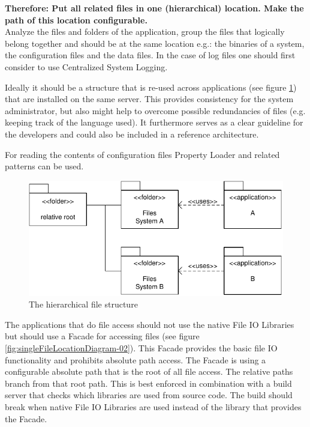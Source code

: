 \begin{center}
   
\end{center}

\textbf{Therefore: Put all related files in one (hierarchical) location. Make the path of this location configurable.}\\

Analyze the files and folders of the application, group the files that logically belong together and should be at the same location e.g.: the binaries of a system, the configuration files and the data files. In the case of log files one should first consider to use {\sc Centralized System Logging}.

Ideally it should be a structure that is re-used across applications (see figure \ref{fig:singleFileLocationDiagram-01}) that are installed on the same server. This provides consistency for the system administrator, but also might help to overcome possible redundancies of files (e.g. keeping track of the language used). It furthermore serves as a clear guideline for the developers and could also be included in a reference architecture.

For reading the contents of configuration files {\sc Property Loader} and related patterns \cite{Wellhausen2010} can be used. 

\begin{figure}[h]
\centering
\includegraphics{patterns/singleFileLocationDiagram-01.pdf}
\caption{The hierarchical file structure}
\label{fig:singleFileLocationDiagram-01}
\end{figure}

The applications that do file access should not use the native File IO Libraries but should use a {\sc Facade} \cite{Gamma95} for accessing files (see figure \ref{fig:singleFileLocationDiagram-02}). This {\sc Facade} provides the basic file IO functionality and prohibits absolute path access. The {\sc Facade} is using a configurable absolute path that is the root of all file access. The relative paths branch from that root path.  This is best enforced in combination with a build server that checks which libraries are used from source code. The build should break when native File IO Libraries are used instead of the library that provides the {\sc Facade}. 

